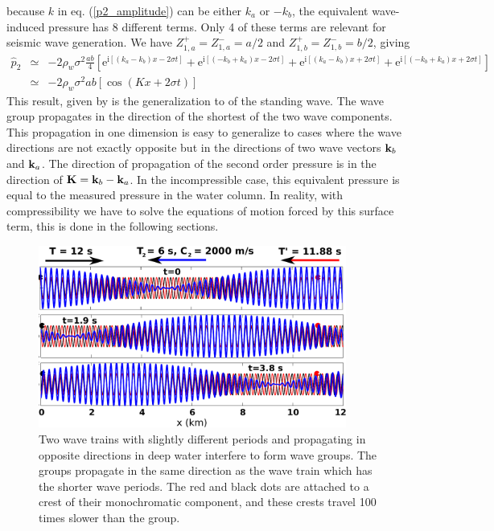 because  $k$ in eq. (\ref{p2_amplitude}) can be  either $k_a$ or $-k_b$, the equivalent wave-induced pressure has 8 different terms. Only  
4 of these terms are relevant for seismic wave generation. We have $Z_{1,a}^{+}=Z_{1,a}^{-}=a/2$ and  $Z_{1,b}^{+}=Z_{1,b}^{-}=b/2$,  giving
\begin{eqnarray}
     \widehat{p}_{2} &\simeq & -2 \rho_w \sigma^2 \frac{ab}{4}
     \left[ \mathrm{e}^{\mathrm{i}  \left[( k_a - k_b) x - 2  \sigma   t\right]}
          + \mathrm{e}^{\mathrm{i} \left[( -k_b + k_a) x - 2  \sigma t\right]} 
           + \mathrm{e}^{\mathrm{i}  \left[( k_a - k_b) x + 2  \sigma   t\right]}
          + \mathrm{e}^{\mathrm{i} \left[( -k_b + k_a) x + 2  \sigma t\right]} 
\right] \nonumber \\
&\simeq &  -2 \rho_w \sigma^2 ab
     \left[ \cos\left(K x + 2  \sigma   t\right) \right] \nonumber 
\end{eqnarray}
This result, given by \cite{Ardhuin&Herbers2013} is the generalization to of the  \cite{Longuet-Higgins1950} standing wave. The wave group 
propagates in the direction of the shortest of the two wave components. 
This propagation in one dimension  is easy to generalize to cases where the wave directions are not exactly opposite but in the directions of two wave vectors $\mathbf{k}_b$ and $\mathbf{k}_a$. 
The direction of propagation of the second order pressure is in the direction of  $\mathbf{K}=\mathbf{k}_b-\mathbf{k}_a$. In the incompressible case, this equivalent pressure 
is equal to the measured pressure in the water column. In reality, with compressibility we have to solve the equations of motion forced by this surface term, this 
is done in the following sections. 
\begin{figure}[ht]
\centerline{\includegraphics[width=0.9\textwidth]{FIGS_CH_SISMO/groupe_negatif.pdf}}
  \caption{Two wave trains with slightly different periods and propagating in opposite directions in deep water interfere to 
  form wave groups. The groups propagate in the same direction as the wave train which has the shorter wave  periods. 
  The red and black dots are attached to a crest of their monochromatic component, and these crests travel 100 times slower than the group.}
\label{fig:group_negative}
\end{figure}

